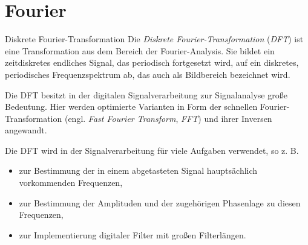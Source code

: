 \section{Fourier}

\begin{defi}{Diskrete Fourier-Transformation}
    Die \emph{Diskrete Fourier-Transformation} (\emph{DFT}) ist eine Transformation aus dem Bereich der Fourier-Analysis.
    Sie bildet ein zeitdiskretes endliches Signal, das periodisch fortgesetzt wird, auf ein diskretes, periodisches Frequenzspektrum ab, das auch als Bildbereich bezeichnet wird.

    Die DFT besitzt in der digitalen Signalverarbeitung zur Signalanalyse große Bedeutung.
    Hier werden optimierte Varianten in Form der schnellen Fourier-Transformation (engl. \emph{Fast Fourier Transform}, \emph{FFT}) und ihrer Inversen angewandt.

    Die DFT wird in der Signalverarbeitung für viele Aufgaben verwendet, so z. B.
    \begin{itemize}
        \item zur Bestimmung der in einem abgetasteten Signal hauptsächlich vorkommenden Frequenzen,
        \item zur Bestimmung der Amplituden und der zugehörigen Phasenlage zu diesen Frequenzen,
        \item zur Implementierung digitaler Filter mit großen Filterlängen.
    \end{itemize}
\end{defi}

